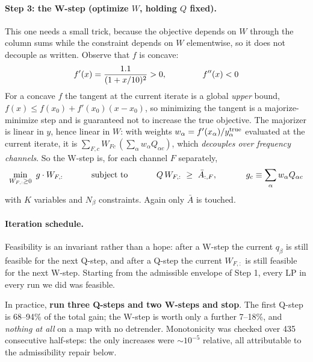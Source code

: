 \documentclass{article}
\numberwithin{equation}{section}   %
\begin{document}
\paragraph*{Step 3: the W-step (optimize $W$, holding $Q$ fixed).}
This one needs a small trick, because the objective depends on $W$ through the column sums while
the constraint depends on $W$ elementwise, so it does not decouple as written. Observe that $f$
is concave:
\begin{equation}
f'(x) = \frac{1.1}{(1+x/10)^2} > 0,
\hspace{1.5cm}
f''(x) < 0
\end{equation}
For a concave $f$ the tangent at the current iterate is a global {\em upper} bound, $f(x) \le
f(x_0) + f'(x_0)(x-x_0)$, so minimizing the tangent is a majorize-minimize step and is guaranteed
not to increase the true objective. The majorizer is linear in $y$, hence linear in $W$: with
weights $w_\alpha = f'(x_\alpha)/y^{\rm true}_\alpha$ evaluated at the current iterate, it is
$\sum_{F,c} W_{Fc}\,(\sum_\alpha w_\alpha Q_{\alpha c})$, which {\em decouples over frequency
channels}. So the W-step is, for each channel $F$ separately,
\begin{equation}
\min_{W_{F,:} \ge 0} \ g \cdot W_{F,:}
\hspace{1.2cm}\mbox{subject to}\hspace{1.2cm}
Q\,W_{F,:} \ \ge \ \bar A_{:,F},
\hspace{1.2cm} g_c \equiv \sum_\alpha w_\alpha Q_{\alpha c}
\label{eq:varmap_wstep}
\end{equation}
with $K$ variables and $N_\beta$ constraints. Again only $\bar A$ is touched.

\paragraph*{Iteration schedule.}
Feasibility is an invariant rather than a hope: after a W-step the current $q_\beta$ is still
feasible for the next Q-step, and after a Q-step the current $W_{F,:}$ is still feasible for the
next W-step. Starting from the admissible envelope of Step 1, every LP in every run we did was
feasible.

In practice, {\bf run three Q-steps and two W-steps and stop}. The first Q-step is 68--94\% of
the total gain; the W-step is worth only a further 7--18\%, and {\em nothing at all} on a map
with no detrender. Monotonicity was checked over 435 consecutive half-steps: the only increases
were $\sim\!10^{-5}$ relative, all attributable to the admissibility repair below.
\end{document}

